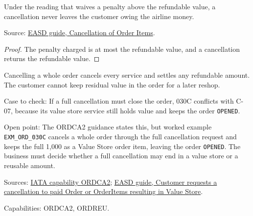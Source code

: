\begin{theorem}
  \label{thm:change-cancellation-not-owing-of-waive}
  Under the reading that waives a penalty above the refundable value, a
  cancellation never leaves the customer owing the airline money.

  Source: \href{https://standards.atlassian.net/wiki/spaces/EASD/pages/574783569/Cancellation+of+Order+Items}{EASD guide, Cancellation of Order Items}.
\end{theorem}
\begin{proof}
  The penalty charged is at most the refundable value, and a cancellation
  returns the refundable value.
\end{proof}

\begin{theorem}
  \label{thm:change-cancellation-full-cancel-no-residual}
  \notready
  Cancelling a whole order cancels every service and settles any refundable
  amount. The customer cannot keep residual value in the order for a later
  reshop.

  Case to check: If a full cancellation must close the order, 030C conflicts
  with C-07, because its value store service still holds value and keeps the
  order \texttt{OPENED}.

  Open point: The ORDCA2 guidance states this, but worked example
  \texttt{EXM\_ORD\_030C} cancels a whole order through the full
  cancellation request and keeps the full 1,000 as a Value Store order item,
  leaving the order \texttt{OPENED}. The business must decide whether a full
  cancellation may end in a value store or a reusable amount.

  Sources: \href{https://retailing.iata.org/armi/docs/ORDCA2/}{IATA capability ORDCA2};
  \href{https://standards.atlassian.net/wiki/spaces/EASD/pages/817594669}{EASD guide, Customer requests a cancellation to paid Order or OrderItems resulting in Value Store}.

  Capabilities: ORDCA2, ORDREU.
\end{theorem}

